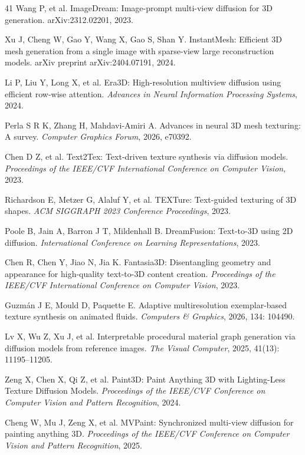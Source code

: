 \documentclass[times,twocolumn,final]{elsarticle}
\begin{document}
\begin{thebibliography}{41}
Wang P, et al. ImageDream: Image-prompt multi-view diffusion for 3D generation. arXiv:2312.02201, 2023.

Xu J, Cheng W, Gao Y, Wang X, Gao S, Shan Y. InstantMesh: Efficient 3D mesh generation from a single image with sparse-view large reconstruction models. arXiv preprint arXiv:2404.07191, 2024.

Li P, Liu Y, Long X, et al. Era3D: High-resolution multiview diffusion using efficient row-wise attention. \textit{Advances in Neural Information Processing Systems}, 2024.

Perla S R K, Zhang H, Mahdavi-Amiri A. Advances in neural 3D mesh texturing: A survey. \textit{Computer Graphics Forum}, 2026, e70392.

Chen D Z, et al. Text2Tex: Text-driven texture synthesis via diffusion models. \textit{Proceedings of the IEEE/CVF International Conference on Computer Vision}, 2023.

Richardson E, Metzer G, Alaluf Y, et al. TEXTure: Text-guided texturing of 3D shapes. \textit{ACM SIGGRAPH 2023 Conference Proceedings}, 2023.

Poole B, Jain A, Barron J T, Mildenhall B. DreamFusion: Text-to-3D using 2D diffusion. \textit{International Conference on Learning Representations}, 2023.

Chen R, Chen Y, Jiao N, Jia K. Fantasia3D: Disentangling geometry and appearance for high-quality text-to-3D content creation. \textit{Proceedings of the IEEE/CVF International Conference on Computer Vision}, 2023.

Guzm\'an J E, Mould D, Paquette E. Adaptive multiresolution exemplar-based texture synthesis on animated fluids. \textit{Computers \& Graphics}, 2026, 134: 104490.

Lv X, Wu Z, Xu J, et al. Interpretable procedural material graph generation via diffusion models from reference images. \textit{The Visual Computer}, 2025, 41(13): 11195--11205.

Zeng X, Chen X, Qi Z, et al. Paint3D: Paint Anything 3D with Lighting-Less Texture Diffusion Models. \textit{Proceedings of the IEEE/CVF Conference on Computer Vision and Pattern Recognition}, 2024.

Cheng W, Mu J, Zeng X, et al. MVPaint: Synchronized multi-view diffusion for painting anything 3D. \textit{Proceedings of the IEEE/CVF Conference on Computer Vision and Pattern Recognition}, 2025.


\end{thebibliography}
\end{document}
